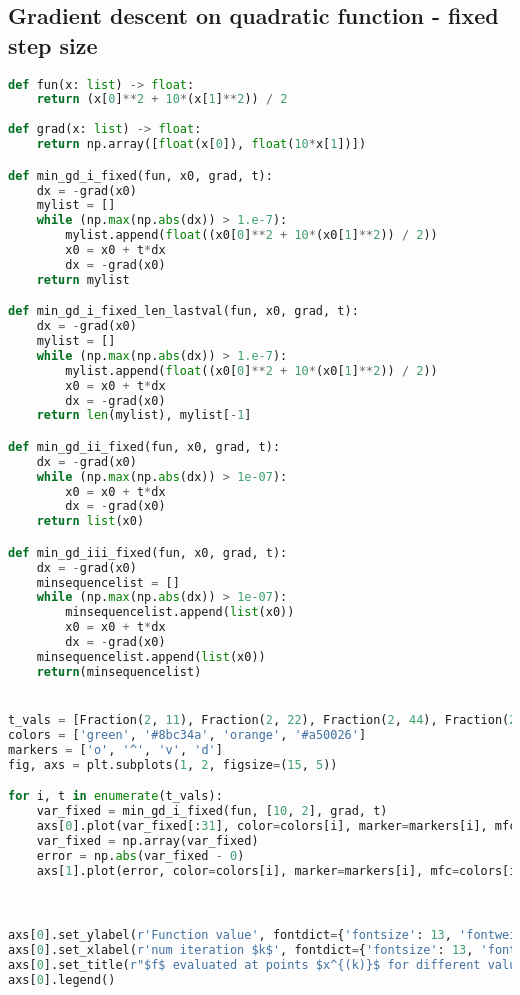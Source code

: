 \subsection{Gradient descent on quadratic function - fixed step size}
\begin{lstlisting}[language=Python, label={lst:code6}, mathescape=true, breaklines=true, escapechar=|]
def fun(x: list) -> float:
    return (x[0]**2 + 10*(x[1]**2)) / 2
    
def grad(x: list) -> float:
    return np.array([float(x[0]), float(10*x[1])]) 

def min_gd_i_fixed(fun, x0, grad, t): 
    dx = -grad(x0)
    mylist = []
    while (np.max(np.abs(dx)) > 1.e-7):
        mylist.append(float((x0[0]**2 + 10*(x0[1]**2)) / 2))
        x0 = x0 + t*dx
        dx = -grad(x0)   
    return mylist

def min_gd_i_fixed_len_lastval(fun, x0, grad, t): 
    dx = -grad(x0)
    mylist = []
    while (np.max(np.abs(dx)) > 1.e-7):
        mylist.append(float((x0[0]**2 + 10*(x0[1]**2)) / 2))
        x0 = x0 + t*dx
        dx = -grad(x0)   
    return len(mylist), mylist[-1]

def min_gd_ii_fixed(fun, x0, grad, t):
    dx = -grad(x0)
    while (np.max(np.abs(dx)) > 1e-07):
        x0 = x0 + t*dx
        dx = -grad(x0)   
    return list(x0)

def min_gd_iii_fixed(fun, x0, grad, t):
    dx = -grad(x0)
    minsequencelist = []
    while (np.max(np.abs(dx)) > 1e-07):
        minsequencelist.append(list(x0))
        x0 = x0 + t*dx
        dx = -grad(x0)  
    minsequencelist.append(list(x0))
    return(minsequencelist)


t_vals = [Fraction(2, 11), Fraction(2, 22), Fraction(2, 44), Fraction(2, 88)] |\label{line:13}|
colors = ['green', '#8bc34a', 'orange', '#a50026']
markers = ['o', '^', 'v', 'd']
fig, axs = plt.subplots(1, 2, figsize=(15, 5))

for i, t in enumerate(t_vals):
    var_fixed = min_gd_i_fixed(fun, [10, 2], grad, t)
    axs[0].plot(var_fixed[:31], color=colors[i], marker=markers[i], mfc=colors[i], label=r"$\tau={{{}/{}}}$".format(t.numerator, t.denominator))
    var_fixed = np.array(var_fixed)
    error = np.abs(var_fixed - 0)
    axs[1].plot(error, color=colors[i], marker=markers[i], mfc=colors[i], label=r"$\tau={{{}/{}}}$".format(t.numerator, t.denominator))



axs[0].set_ylabel(r'Function value', fontdict={'fontsize': 13, 'fontweight': 'medium'}) 
axs[0].set_xlabel(r'num iteration $k$', fontdict={'fontsize': 13, 'fontweight': 'medium'}) 
axs[0].set_title(r"$f$ evaluated at points $x^{(k)}$ for different values of $\tau$", fontdict={'fontsize': 12, 'fontweight': 'medium'}) 
axs[0].legend()


\end{lstlisting}
